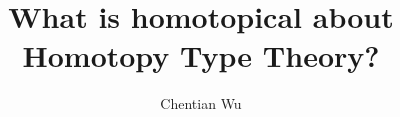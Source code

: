 \documentclass[12pt]{amsart}
\title{What is homotopical about Homotopy Type Theory?}
\author{Chentian Wu}
\date{}
\begin{document}
\maketitle

\begin{abstract}
  
\end{abstract}

\tableofcontents










\end{document}
